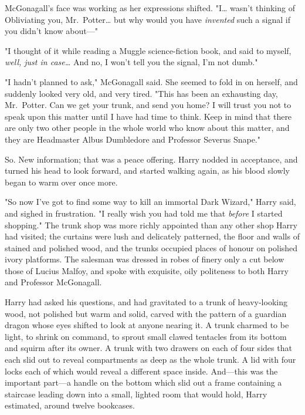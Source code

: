 McGonagall's face was working as her expressions shifted. "I{\ldots} wasn't
thinking of Obliviating you, Mr.~Potter{\ldots} but why would you have
\emph{invented} such a signal if you didn't know about---"

"I thought of it while reading a Muggle science-fiction book, and said to
myself, \emph{well, just in case{\ldots}} And no, I won't tell you the signal,
I'm not dumb."

"I hadn't planned to ask," McGonagall said. She seemed to fold in on herself,
and suddenly looked very old, and very tired. "This has been an exhausting day,
Mr.~Potter. Can we get your trunk, and send you home? I will trust you not to
speak upon this matter until I have had time to think. Keep in mind that there
are only two other people in the whole world who know about this matter, and
they are Headmaster Albus Dumbledore and Professor Severus Snape."

So. New information; that was a peace offering. Harry nodded in acceptance, and
turned his head to look forward, and started walking again, as his blood slowly
began to warm over once more.

"So now I've got to find some way to kill an immortal Dark Wizard," Harry said,
and sighed in frustration. "I really wish you had told me that \emph{before} I
started shopping."
\later
The trunk shop was more richly appointed than any other shop Harry had visited;
the curtains were lush and delicately patterned, the floor and walls of stained
and polished wood, and the trunks occupied places of honour on polished ivory
platforms. The salesman was dressed in robes of finery only a cut below those
of Lucius Malfoy, and spoke with exquisite, oily politeness to both Harry and
Professor McGonagall.

Harry had asked his questions, and had gravitated to a trunk of heavy-looking
wood, not polished but warm and solid, carved with the pattern of a guardian
dragon whose eyes shifted to look at anyone nearing it. A trunk charmed to be
light, to shrink on command, to sprout small clawed tentacles from its bottom
and squirm after its owner. A trunk with two drawers on each of four sides that
each slid out to reveal compartments as deep as the whole trunk. A lid with
four locks each of which would reveal a different space inside. And---this was
the important part---a handle on the bottom which slid out a frame containing a
staircase leading down into a small, lighted room that would hold, Harry
estimated, around twelve bookcases.

